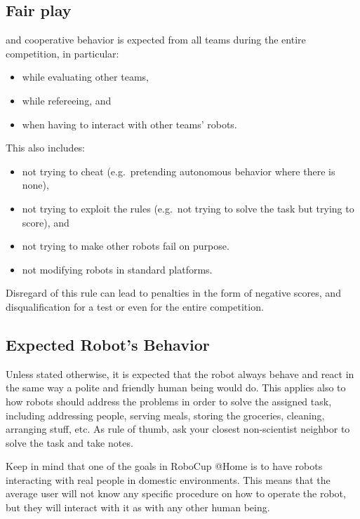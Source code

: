 \subsection{Fair play}
\label{rule:fairplay}
 and cooperative behavior is expected from all teams during the entire competition, in particular:
\begin{itemize}
	\item while evaluating other teams,
	\item while refereeing, and
	\item when having to interact with other teams' robots.
\end{itemize}
This also includes:
\begin{itemize}
	\item not trying to cheat (e.g.~pretending autonomous behavior where there is none),
	\item not trying to exploit the rules (e.g.~not trying to solve the task but trying to score), and
	\item not trying to make other robots fail on purpose.
	\item not modifying robots in standard platforms.
\end{itemize}
Disregard of this rule can lead to penalties in the form of negative scores, and disqualification for a test or even for the entire competition.

\subsection{Expected Robot's Behavior}
Unless stated otherwise, it is expected that the robot always behave and react in the same way a polite and friendly human being would do. This applies also to how robots should address the problems in order to solve the assigned task, including addressing people, serving meals, storing the groceries, cleaning, arranging stuff, etc. As rule of thumb, ask your closest non-scientist neighbor to solve the task and take notes.

Keep in mind that one of the goals in RoboCup @Home is to have robots interacting with real people in domestic environments. This means that the average user will not know any specific procedure on how to operate the robot, but they will interact with it as with any other human being.


